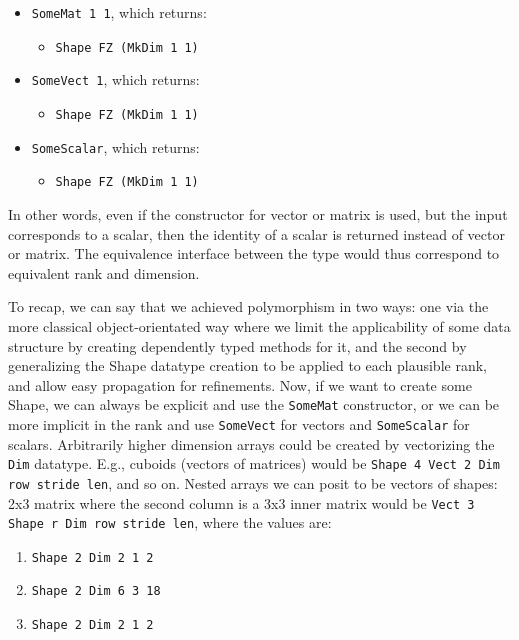 \documentclass{report}
\begin{document}
\begin{itemize}
  \item \verb|SomeMat 1 1|, which returns:
  \begin{itemize}
    \item \verb|Shape FZ (MkDim 1 1)|
  \end{itemize}
  \item \verb|SomeVect 1|, which returns:
  \begin{itemize}
    \item \verb|Shape FZ (MkDim 1 1)|
  \end{itemize}  
  \item \verb|SomeScalar|, which returns:
  \begin{itemize}
    \item \verb|Shape FZ (MkDim 1 1)|
  \end{itemize}  
\end{itemize}

In other words, even if the constructor for vector or matrix is used, but the input corresponds to a scalar, then the identity of a scalar is returned instead of vector or matrix. The equivalence interface between the type would thus correspond to equivalent rank and dimension.

To recap, we can say that we achieved polymorphism in two ways: one via the more classical object-orientated way where we limit the applicability of some data structure by creating dependently typed methods for it, and the second by generalizing the Shape datatype creation to be applied to each plausible rank, and allow easy propagation for refinements. Now, if we want to create some Shape, we can always be explicit and use the \verb|SomeMat| constructor, or we can be more implicit in the rank and use \verb|SomeVect| for vectors and \verb|SomeScalar| for scalars. Arbitrarily higher dimension arrays could be created by vectorizing the \verb|Dim| datatype. E.g., cuboids (vectors of matrices) would be \verb|Shape 4 Vect 2 Dim row stride len|, and so on. Nested arrays we can posit to be vectors of shapes: 2x3 matrix where the second column is a 3x3 inner matrix would be \verb|Vect 3 Shape r Dim row stride len|, where the values are:

\begin{enumerate}
    \item \verb|Shape 2 Dim 2 1 2|
    \item \verb|Shape 2 Dim 6 3 18|
    \item \verb|Shape 2 Dim 2 1 2|
\end{enumerate}
\end{document}
